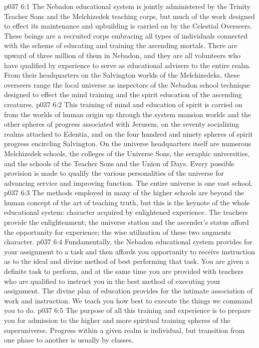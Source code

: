 \vs p037 6:1 The Nebadon educational system is jointly administered by the Trinity Teacher Sons and the Melchizedek teaching corps, but much of the work designed to effect its maintenance and upbuilding is carried on by the Celestial Overseers. These beings are a recruited corps embracing all types of individuals connected with the scheme of educating and training the ascending mortals. There are upward of three million of them in Nebadon, and they are all volunteers who have qualified by experience to serve as educational advisers to the entire realm. From their headquarters on the Salvington worlds of the Melchizedeks, these overseers range the local universe as inspectors of the Nebadon school technique designed to effect the mind training and the spirit education of the ascending creatures.
\vs p037 6:2 This training of mind and education of spirit is carried on from the worlds of human origin up through the system mansion worlds and the other spheres of progress associated with Jerusem, on the seventy socializing realms attached to Edentia, and on the four hundred and ninety spheres of spirit progress encircling Salvington. On the universe headquarters itself are numerous Melchizedek schools, the colleges of the Universe Sons, the seraphic universities, and the schools of the Teacher Sons and the Union of Days. Every possible provision is made to qualify the various personalities of the universe for advancing service and improving function. The entire universe is one vast school.
\pc \vs p037 6:3 The methods employed in many of the higher schools are beyond the human concept of the art of teaching truth, but this is the keynote of the whole educational system: character acquired by enlightened experience. The teachers provide the enlightenment; the universe station and the ascender’s status afford the opportunity for experience; the wise utilization of these two augments character.
\vs p037 6:4 Fundamentally, the Nebadon educational system provides for your assignment to a task and then affords you opportunity to receive instruction as to the ideal and divine method of best performing that task. You are given a definite task to perform, and at the same time you are provided with teachers who are qualified to instruct you in the best method of executing your assignment. The divine plan of education provides for the intimate association of work and instruction. We teach you how best to execute the things we command you to do.
\pc \vs p037 6:5 The purpose of all this training and experience is to prepare you for admission to the higher and more spiritual training spheres of the superuniverse. Progress within a given realm is individual, but transition from one phase to another is usually by classes.
